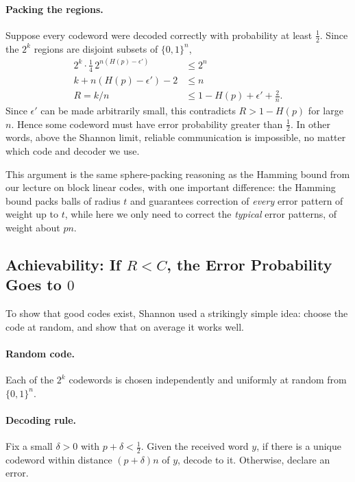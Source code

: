 \paragraph{Packing the regions.} Suppose every codeword were decoded correctly with probability at least \(\frac{1}{2}\). Since the \(2^k\) regions are disjoint subsets of \(\{0,1\}^n\),
\begin{align*}
2^k \cdot \tfrac{1}{4}\, 2^{n(H(p) - \epsilon')} &\leq 2^n \\
k + n(H(p) - \epsilon') - 2 &\leq n \\
R = k/n &\leq 1 - H(p) + \epsilon' + \tfrac{2}{n}.
\end{align*}
Since \(\epsilon'\) can be made arbitrarily small, this contradicts \(R > 1 - H(p)\) for large \(n\). Hence some codeword must have error probability greater than \(\frac{1}{2}\). In other words, above the Shannon limit, reliable communication is impossible, no matter which code and decoder we use.

This argument is the same sphere-packing reasoning as the Hamming bound from our lecture on block linear codes, with one important difference: the Hamming bound packs balls of radius \(t\) and guarantees correction of \emph{every} error pattern of weight up to \(t\), while here we only need to correct the \emph{typical} error patterns, of weight about \(pn\).

\subsection{Achievability: If \(R < C\), the Error Probability Goes to \(0\)}
To show that good codes exist, Shannon used a strikingly simple idea: choose the code at random, and show that on average it works well.

\paragraph{Random code.} Each of the \(2^k\) codewords is chosen independently and uniformly at random from \(\{0,1\}^n\).

\paragraph{Decoding rule.} Fix a small \(\delta > 0\) with \(p + \delta < \frac{1}{2}\). Given the received word \(y\), if there is a unique codeword within distance \((p + \delta)n\) of \(y\), decode to it. Otherwise, declare an error.

